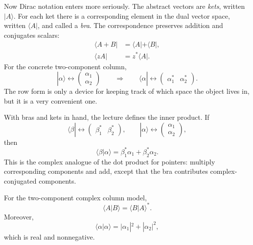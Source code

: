 Now Dirac notation enters more seriously. The abstract vectors are \emph{kets}, written \( |A\rangle \). For each ket there is a corresponding element in the dual vector space, written \( \langle A| \), and called a \emph{bra}. The correspondence preserves addition and conjugates scalars:
\begin{align}
\langle A+B| &= \langle A|+\langle B|,\\
\langle zA| &= z^*\langle A|.
\end{align}
For the concrete two-component column,
\begin{equation}
|\alpha\rangle
\leftrightarrow
\begin{pmatrix}
\alpha_1\\
\alpha_2
\end{pmatrix}
\qquad\Longrightarrow\qquad
\langle \alpha|
\leftrightarrow
\begin{pmatrix}
\alpha_1^* & \alpha_2^*
\end{pmatrix}.
\end{equation}
The row form is only a device for keeping track of which space the object lives in, but it is a very convenient one.

With bras and kets in hand, the lecture defines the inner product. If
\[
\langle\beta|
\leftrightarrow
\begin{pmatrix}
\beta_1^* & \beta_2^*
\end{pmatrix},
\qquad
|\alpha\rangle
\leftrightarrow
\begin{pmatrix}
\alpha_1\\
\alpha_2
\end{pmatrix},
\]
then
\begin{equation}
\langle\beta|\alpha\rangle
=
\beta_1^*\alpha_1+\beta_2^*\alpha_2.
\end{equation}
This is the complex analogue of the dot product for pointers: multiply corresponding components and add, except that the bra contributes complex-conjugated components.

\begin{proposition}
For the two-component complex column model,
\begin{equation}
\langle A|B\rangle=\langle B|A\rangle^*.
\end{equation}
Moreover,
\begin{equation}
\langle \alpha|\alpha\rangle
=
|\alpha_1|^2+|\alpha_2|^2,
\end{equation}
which is real and nonnegative.
\end{proposition}

